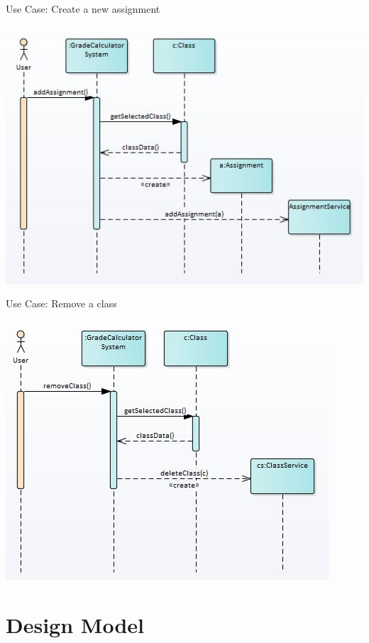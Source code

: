 \documentclass[12pt]{article}
\begin{document}
\noindent
Use Case: Create a new assignment

\noindent
\includegraphics[width=\textwidth]{SequenceDiagram2} \\

\newpage

\noindent
Use Case: Remove a class

\noindent
\includegraphics[width=\textwidth]{SequenceDiagram3} \\

\newpage

\section*{Design Model}
\end{document}
